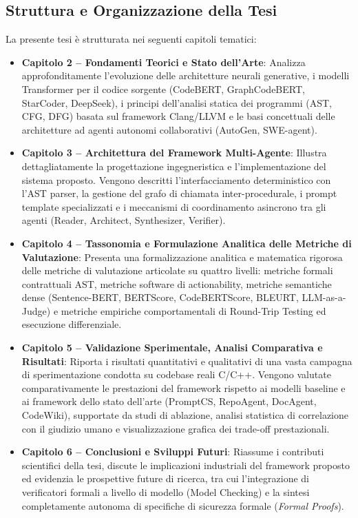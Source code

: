 \subsection{Struttura e Organizzazione della Tesi}
\label{subsec:struttura_tesi}
La presente tesi è strutturata nei seguenti capitoli tematici:
\begin{itemize}[leftmargin=*, label=\textbullet]
    \item \textbf{Capitolo 2 -- Fondamenti Teorici e Stato dell'Arte}: Analizza approfonditamente l'evoluzione delle architetture neurali generative, i modelli Transformer per il codice sorgente (CodeBERT, GraphCodeBERT, StarCoder, DeepSeek), i principi dell'analisi statica dei programmi (AST, CFG, DFG) basata sul framework Clang/LLVM e le basi concettuali delle architetture ad agenti autonomi collaborativi (AutoGen, SWE-agent).
    \item \textbf{Capitolo 3 -- Architettura del Framework Multi-Agente}: Illustra dettagliatamente la progettazione ingegneristica e l'implementazione del sistema proposto. Vengono descritti l'interfacciamento deterministico con l'AST parser, la gestione del grafo di chiamata inter-procedurale, i prompt template specializzati e i meccanismi di coordinamento asincrono tra gli agenti (Reader, Architect, Synthesizer, Verifier).
    \item \textbf{Capitolo 4 -- Tassonomia e Formulazione Analitica delle Metriche di Valutazione}: Presenta una formalizzazione analitica e matematica rigorosa delle metriche di valutazione articolate su quattro livelli: metriche formali contrattuali AST, metriche software di actionability, metriche semantiche dense (Sentence-BERT, BERTScore, CodeBERTScore, BLEURT, LLM-as-a-Judge) e metriche empiriche comportamentali di Round-Trip Testing ed esecuzione differenziale.
    \item \textbf{Capitolo 5 -- Validazione Sperimentale, Analisi Comparativa e Risultati}: Riporta i risultati quantitativi e qualitativi di una vasta campagna di sperimentazione condotta su codebase reali C/C++. Vengono valutate comparativamente le prestazioni del framework rispetto ai modelli baseline e ai framework dello stato dell'arte (PromptCS, RepoAgent, DocAgent, CodeWiki), supportate da studi di ablazione, analisi statistica di correlazione con il giudizio umano e visualizzazione grafica dei trade-off prestazionali.
    \item \textbf{Capitolo 6 -- Conclusioni e Sviluppi Futuri}: Riassume i contributi scientifici della tesi, discute le implicazioni industriali del framework proposto ed evidenzia le prospettive future di ricerca, tra cui l'integrazione di verificatori formali a livello di modello (Model Checking) e la sintesi completamente autonoma di specifiche di sicurezza formale (\emph{Formal Proofs}).
\end{itemize}
